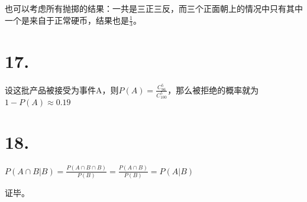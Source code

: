 \documentclass[UTF8]{article}
\begin{document}
        也可以考虑所有抛掷的结果：一共是三正三反，而三个正面朝上的情况中只有其中一个是来自于正常硬币，结果也是$\frac{1}{3}$。
    \section*{17.}
        设这批产品被接受为事件A，则$P(A) = \frac{C_{96}^{5}}{C_{100}^5}$，那么被拒绝的概率就为$1 - P(A) \approx 0.19$
    \section*{18.}
        $P(A \cap B|B) = \frac{P(A \cap B \cap B)}{P(B)} = \frac{P(A \cap B)}{P(B)} = P(A|B)$

        证毕。
\end{document}
